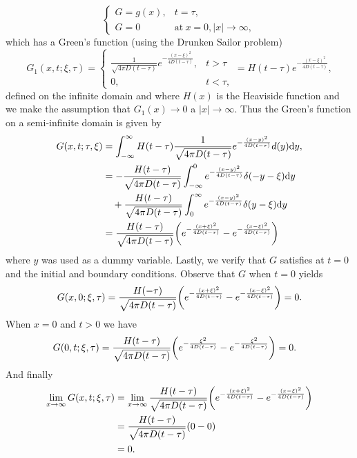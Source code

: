 \documentclass[12pt]{report}
\begin{document}
\begin{solution}
\begin{enumerate}
\[\begin{cases}
                G = g(x), & t = \tau,\\
                G=0 &\text{at}~ x=0,|x|\to\infty,
            \end{cases}
        \]
        which has a Green's function (using the Drunken Sailor problem)
        \[ 
            G_1(x,t;\xi,\tau) = \begin{cases}
                \frac{1}{\sqrt{4\pi D(t - \tau)}}e^{-\frac{(x-\xi)^2}{4D(t-\tau)}}, &t>\tau\\
                0, &t<\tau,
            \end{cases} = H(t - \tau)e^{-\frac{(x-\xi)^2}{4D(t-\tau)}},
        \]
        defined on the infinite domain and where $H(x)$ is the Heaviside function and we make the assumption that $G_1(x) \to 0$ a $|x| \to \infty$. Thus the Green's function on a semi-infinite domain is given by 
        \begin{align*}
            G(x,t;\tau,\xi) &= \int^\infty_{-\infty}H(t - \tau)\frac{1}{\sqrt{4\pi D(t - \tau)}}e^{-\frac{(x-y)^2}{4D(t-\tau)}} d(y) {\mathrm{d}} y,\\
            &= -\frac{H(t - \tau)}{\sqrt{4\pi D(t - \tau)}}\int_{-\infty}^0 e^{-\frac{(x-y)^2}{4D(t-\tau)}} \delta(-y-\xi) {\mathrm{d}} y\\
            &\quad + \frac{H(t - \tau)}{\sqrt{4\pi D(t - \tau)}}\int^{\infty}_0 e^{-\frac{(x-y)^2}{4D(t-\tau)}} \delta(y-\xi) {\mathrm{d}} y\\
            &= \frac{H(t - \tau)}{\sqrt{4\pi D(t - \tau)}} {\left(e^{-\frac{(x+\xi)^2}{4D(t-\tau)}} - e^{-\frac{(x-\xi)^2}{4D(t-\tau)}}\right)}
        \end{align*}
        where $y$ was used as a dummy variable. Lastly, we verify that $G$ satisfies  at $t=0$ and the initial and boundary conditions. Observe that $G$ when $t=0$ yields
        \begin{align*}
            G(x,0;\xi,\tau) = \frac{H(- \tau)}{\sqrt{4\pi D(t - \tau)}} {\left(e^{-\frac{(x+\xi)^2}{4D(t-\tau)}} - e^{-\frac{(x-\xi)^2}{4D(t-\tau)}}\right)} = 0.
        \end{align*}  
        When $x=0$ and $t>0$ we have
        \begin{align*}
            G(0,t;\xi,\tau) &= \frac{H(t - \tau)}{\sqrt{4\pi D(t - \tau)}} {\left(e^{-\frac{\xi^2}{4D(t-\tau)}} - e^{-\frac{\xi^2}{4D(t-\tau)}}\right)}= 0.
        \end{align*}
        And finally
        \begin{align*}
            \lim_{x\to\infty}G(x,t;\xi,\tau) &= \lim_{x\to\infty} \frac{H(t - \tau)}{\sqrt{4\pi D(t - \tau)}} {\left(e^{-\frac{(x+\xi)^2}{4D(t-\tau)}} - e^{-\frac{(x-\xi)^2}{4D(t-\tau)}}\right)}\\
            &= \frac{H(t - \tau)}{\sqrt{4\pi D(t - \tau)}} {\left(0 - 0\right)}\\
            &= 0.
        \end{align*}


\end{enumerate}
\end{solution}
\end{document}
